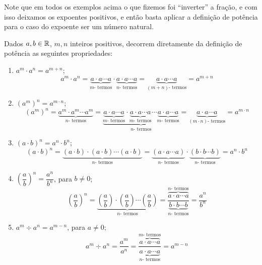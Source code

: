  Note que em todos os exemplos acima o que fizemos foi ``inverter'' a fração, e com isso deixamos os expoentes positivos, e então basta aplicar a definição de potência para o caso do expoente ser um número natural.

  Dados $a, b \in \mathbb{R}$, $m, n$ inteiros positivos, decorrem diretamente da definição de potência as seguintes propriedades:
 \begin{enumerate}[P1)]
 \item $a^m \cdot a^n= a^{m + n}$;
\begin{equation*}
a^m \cdot a^n = \underbrace{a \cdot a \cdots a}_{m \text{- termos}}\cdot \underbrace{a \cdot a \cdots a}_{n \text{- termos}}= \underbrace{a \cdot a \cdots a}_{(m+n) \text{- termos}}= a^{m + n} 
\end{equation*}

 \item $(a^m)^n= a^{m \cdot n}$;
\begin{equation*}
(a^m)^n= \underbrace{a^m \cdot a^m \cdots a^m}_{n \text{- termos}}= \underbrace{\underbrace{a \cdot a \cdots a}_{m \text{- termos}} \cdot \underbrace{a \cdot a \cdots a}_{m \text{- termos}} \cdots \underbrace{a \cdot a \cdots a}_{m \text{- termos}}}_{n \text{- termos}}= \underbrace{a \cdot a \cdots a}_{(m \cdot n) \text{- termos}}= a^{m \cdot n}
\end{equation*}

 \item $(a \cdot b)^n= a^n \cdot b^n$;
\begin{equation*}
(a \cdot b)^n= \underbrace{(a \cdot b) \cdot (a\cdot b) \cdots (a \cdot b)}_{n \text{- termos}}= \underbrace{(a \cdot a \cdots a)}_{n \text{- termos}} \cdot \underbrace{(b \cdot b \cdots b)}_{n \text{- termos}}= a^n \cdot b^n
\end{equation*}

 \item $\left(\dfrac{a}{b}\right)^n= \dfrac{a^n}{b^n}$, para $b \neq 0$;
 \[\left(\dfrac{a}{b}\right)^n=
 \underbrace{\left(\dfrac{a}{b}\right) \cdot \left(\dfrac{a}{b}\right) \cdots \left(\dfrac{a}{b}\right)}_{n \text{- termos}}= \dfrac{\overbrace{a \cdot a \cdots a}^{n \text{- termos}}}{\underbrace{b \cdot b \cdots b}_{n \text{- termos}}}= \dfrac{a^n}{b^n}\]

 \item $a^m \div a^n= a^{m - n}$, para $a \neq 0$;
\begin{equation*}
a^m \div a^n= \dfrac{a^m}{a^n}= \dfrac{\overbrace{a \cdot a \cdots a}^{m \text{- termos}}}{\underbrace{a \cdot a \cdots a}_{n \text{- termos}}} = a^{m - n}
\end{equation*}


\end{enumerate}
